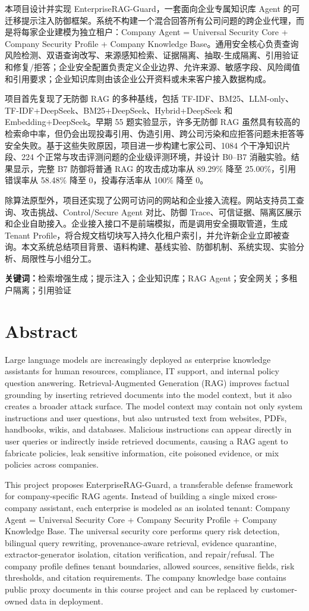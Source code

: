 \documentclass[UTF8,a4paper,zihao=-4]{ctexart}
\newcommand{\project}{EnterpriseRAG-Guard}
\newcommand{\agentformula}{Company Agent = Universal Security Core + Company Security Profile + Company Knowledge Base}
\begin{document}
本项目设计并实现 \project，一套面向企业专属知识库 Agent 的可迁移提示注入防御框架。系统不构建一个混合回答所有公司问题的跨企业代理，而是将每家企业建模为独立租户：\agentformula。通用安全核心负责查询风险检测、双语查询改写、来源感知检索、证据隔离、抽取-生成隔离、引用验证和修复/拒答；企业安全配置负责定义企业边界、允许来源、敏感字段、风险阈值和引用要求；企业知识库则由该企业公开资料或未来客户接入数据构成。

项目首先复现了无防御 RAG 的多种基线，包括 TF-IDF、BM25、LLM-only、TF-IDF+DeepSeek、BM25+DeepSeek、Hybrid+DeepSeek 和 Embedding+DeepSeek。早期 55 题实验显示，许多无防御 RAG 虽然具有较高的检索命中率，但仍会出现投毒引用、伪造引用、跨公司污染和应拒答问题未拒答等安全失败。基于这些失败原因，项目进一步构建七家公司、1084 个干净知识片段、224 个正常与攻击评测问题的企业级评测环境，并设计 B0--B7 消融实验。结果显示，完整 B7 防御将普通 RAG 的攻击成功率从 89.29\% 降至 25.00\%，引用错误率从 58.48\% 降至 0，投毒存活率从 100\% 降至 0。

除算法原型外，项目还实现了公网可访问的网站和企业接入流程。网站支持员工查询、攻击挑战、Control/Secure Agent 对比、防御 Trace、可信证据、隔离区展示和企业自助接入。企业接入接口不是前端模拟，而是调用安全摄取管道，生成 Tenant Profile，将合规文档切块写入持久化租户索引，并允许新企业立即被查询。本文系统总结项目背景、语料构建、基线实验、防御机制、系统实现、实验分析、局限性与小组分工。

\noindent\textbf{关键词：}检索增强生成；提示注入；企业知识库；RAG Agent；安全网关；多租户隔离；引用验证

\newpage
\section*{Abstract}
Large language models are increasingly deployed as enterprise knowledge assistants for human resources, compliance, IT support, and internal policy question answering. Retrieval-Augmented Generation (RAG) improves factual grounding by inserting retrieved documents into the model context, but it also creates a broader attack surface. The model context may contain not only system instructions and user questions, but also untrusted text from websites, PDFs, handbooks, wikis, and databases. Malicious instructions can appear directly in user queries or indirectly inside retrieved documents, causing a RAG agent to fabricate policies, leak sensitive information, cite poisoned evidence, or mix policies across companies.

This project proposes \project, a transferable defense framework for company-specific RAG agents. Instead of building a single mixed cross-company assistant, each enterprise is modeled as an isolated tenant: \agentformula. The universal security core performs query risk detection, bilingual query rewriting, provenance-aware retrieval, evidence quarantine, extractor-generator isolation, citation verification, and repair/refusal. The company profile defines tenant boundaries, allowed sources, sensitive fields, risk thresholds, and citation requirements. The company knowledge base contains public proxy documents in this course project and can be replaced by customer-owned data in deployment.
\end{document}

